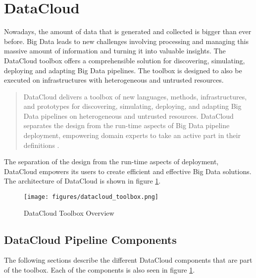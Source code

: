 \documentclass{article}
\begin{document}
        
        \section{DataCloud}
        \label{sec:datacloud}
        
        Nowadays, the amount of data that is generated and collected is bigger than ever before.
        Big Data leads to new challenges involving processing and managing this massive amount of information and turning it into valuable insights.
        The DataCloud toolbox offers a comprehensible solution for discovering, simulating, deploying and adapting Big Data pipelines.
        The toolbox is designed to also be executed on infrastructures with heterogeneous and untrusted resources.
        
        
        \begin{quote}
            DataCloud delivers a toolbox of new languages, methods, infrastructures, and prototypes for discovering, simulating, deploying, and adapting Big Data pipelines on heterogeneous and untrusted resources. DataCloud separates the design from the run-time aspects of Big Data pipeline deployment, empowering domain experts to take an active part in their definitions \cite{dumitruProjectProjectDataCloud}.
        \end{quote}
        The separation of the design from the run-time aspects of deployment, DataCloud empowers its users to create efficient and effective Big Data solutions.
        The architecture of DataCloud is shown in figure \ref{fig:datacloud-toolbox-overview}.
        
        \begin{figure}[h!]
            \centering
            \texttt{[image: figures/datacloud\_toolbox.png]}
            \caption{DataCloud Toolbox Overview \cite{dumitruDataCloudToolbox}}
            \label{fig:datacloud-toolbox-overview}
        \end{figure}
        
        
        \subsection{DataCloud Pipeline Components}
        \label{sec:architecture-datacloud}
        
        The following sections describe the different DataCloud components that are part of the toolbox.
        Each of the components is also seen in figure \ref{fig:datacloud-toolbox-overview}.
        
\end{document}
